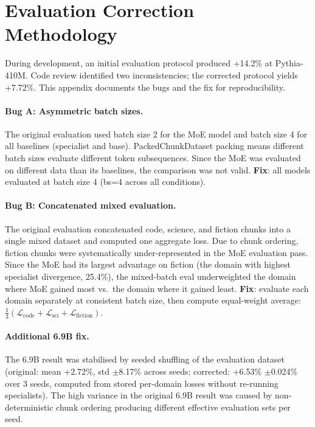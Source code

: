 \documentclass{article}
\begin{document}
\section{Evaluation Correction Methodology}
\label{app:evalcorrection}

During development, an initial evaluation protocol produced +14.2\% at Pythia-410M. Code review identified two inconsistencies; the corrected protocol yields +7.72\%. This appendix documents the bugs and the fix for reproducibility.

\paragraph{Bug A: Asymmetric batch sizes.} The original evaluation used batch size 2 for the MoE model and batch size 4 for all baselines (specialist and base). PackedChunkDataset packing means different batch sizes evaluate different token subsequences. Since the MoE was evaluated on different data than its baselines, the comparison was not valid. \textbf{Fix}: all models evaluated at batch size 4 (bs=4 across all conditions).

\paragraph{Bug B: Concatenated mixed evaluation.} The original evaluation concatenated code, science, and fiction chunks into a single mixed dataset and computed one aggregate loss. Due to chunk ordering, fiction chunks were systematically under-represented in the MoE evaluation pass. Since the MoE had its largest advantage on fiction (the domain with highest specialist divergence, 25.4\%), the mixed-batch eval underweighted the domain where MoE gained most vs.\ the domain where it gained least. \textbf{Fix}: evaluate each domain separately at consistent batch size, then compute equal-weight average: $\frac{1}{3}(\mathcal{L}_\text{code} + \mathcal{L}_\text{sci} + \mathcal{L}_\text{fiction})$.

\paragraph{Additional 6.9B fix.} The 6.9B result was stabilised by seeded shuffling of the evaluation dataset (original: mean +2.72\%, std $\pm$8.17\% across seeds; corrected: +6.53\% $\pm$0.024\% over 3 seeds, computed from stored per-domain losses without re-running specialists). The high variance in the original 6.9B result was caused by non-deterministic chunk ordering producing different effective evaluation sets per seed.
\end{document}
